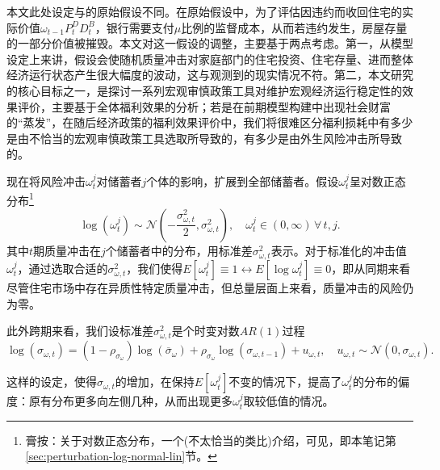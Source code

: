 本文此处设定与\cite{Bernanke1999}的原始假设不同。在原始假设中，为了评估因违约而收回住宅的实际价值$\omega_{t-1} P_{t}^{D} D_{t}^{B}$，银行需要支付$\mu$比例的监督成本，从而若违约发生，房屋存量的一部分价值被摧毁。本文对这一假设的调整，主要基于两点考虑。第一，从模型设定上来讲，\cite{Bernanke1999}假设会使随机质量冲击对家庭部门的住宅投资、住宅存量、进而整体经济运行状态产生很大幅度的波动，这与观测到的现实情况不符\citep{Forlati:2011wy}。第二，本文研究的核心目标之一，是探讨一系列宏观审慎政策工具对维护宏观经济运行稳定性的效果评价，主要基于全体福利效果的分析；若是在前期模型构建中出现社会财富的``蒸发''，在随后经济政策的福利效果评价中，我们将很难区分福利损耗中有多少是由不恰当的宏观审慎政策工具选取所导致的，有多少是由外生风险冲击所导致的。

现在将风险冲击$\omega_{t}^{j}$对储蓄者$j$个体的影响，扩展到全部储蓄者。假设$\omega_{t}^{j}$呈对数正态分布\footnote{膏按：关于对数正态分布，一个(不太恰当的类比)介绍，可见\cite[Sec 10.5.4]{Zhuyanyuan:2018tm}，即本笔记第\ref{sec:perturbation-log-normal-lin}节。}
\begin{equation}
  \label{eq:housing-omega-lognormal-distribution}
  \log \left( \omega_{t}^{j} \right) \sim \mathcal{N} \left( - \frac{\sigma_{\omega, t}^{2}}{2}, \sigma_{\omega, t}^{2} \right), \quad \omega_{t}^{j} \in \left( 0, \infty \right) \, \forall \, t, j.
\end{equation}
其中$t$期质量冲击在$j$个储蓄者中的分布，用标准差$\sigma_{\omega, t}^{2}$表示。对于标准化的冲击值$\omega_{t}^{j}$，通过选取合适的$\sigma_{\omega, t}^{2}$，我们使得$E\left[ \omega_{t}^{j} \right] \equiv 1 \leftrightarrow E \left[ \log \omega_{t}^{j} \right]  \equiv 0$，即从同期来看尽管住宅市场中存在异质性特定质量冲击，但总量层面上来看，质量冲击的风险仍为零。

此外跨期来看，我们设标准差$\sigma_{\omega, t}^{2}$是个时变对数$AR(1)$过程
\begin{equation}
  \label{eq:housing-var-ar1}
  \log \left( \sigma_{\omega, t} \right) =
  \left( 1 - \rho_{\sigma_{\omega}} \right) \log \left( \overline{\sigma}_{\omega} \right)
  + \rho_{\sigma_{\omega}}  \log \left( \sigma_{\omega, t-1} \right)
  + u_{\omega, t}, \quad u_{\omega, t} \sim \mathcal{N} \left( 0 , \sigma_{\omega, t} \right).
\end{equation}

这样的设定，使得$\sigma_{\omega, t}$的增加，在保持$E \left[ \omega_{t}^{j} \right]$不变的情况下，提高了$\omega_{t}^{j}$的分布的偏度：原有分布更多向左侧几种，从而出现更多$\omega_{t}^{j}$取较低值的情况。

